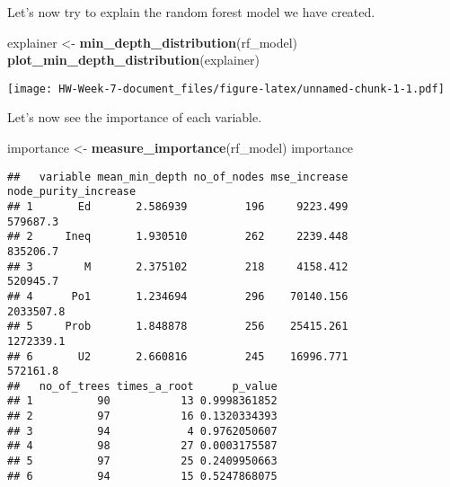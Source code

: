 \documentclass[
]{article}
\newenvironment{Shaded}{\begin{snugshade}}{\end{snugshade}}
\newcommand{\CommentTok}[1]{\textcolor[rgb]{0.56,0.35,0.01}{\textit{#1}}}
\newcommand{\FunctionTok}[1]{\textcolor[rgb]{0.13,0.29,0.53}{\textbf{#1}}}
\newcommand{\NormalTok}[1]{#1}
\newcommand{\OtherTok}[1]{\textcolor[rgb]{0.56,0.35,0.01}{#1}}
\begin{document}
Let's now try to explain the random forest model we have created.

\begin{Shaded}
\begin{Highlighting}[]
\NormalTok{explainer }\OtherTok{\textless{}{-}} \FunctionTok{min\_depth\_distribution}\NormalTok{(rf\_model)}
\FunctionTok{plot\_min\_depth\_distribution}\NormalTok{(explainer)}
\end{Highlighting}
\end{Shaded}

\texttt{[image: HW-Week-7-document\_files/figure-latex/unnamed-chunk-1-1.pdf]}

\begin{Shaded}
\end{Shaded}

Let's now see the importance of each variable.

\begin{Shaded}
\begin{Highlighting}[]
\NormalTok{importance }\OtherTok{\textless{}{-}} \FunctionTok{measure\_importance}\NormalTok{(rf\_model)}
\NormalTok{importance}
\end{Highlighting}
\end{Shaded}

\begin{verbatim}
##   variable mean_min_depth no_of_nodes mse_increase node_purity_increase
## 1       Ed       2.586939         196     9223.499             579687.3
## 2     Ineq       1.930510         262     2239.448             835206.7
## 3        M       2.375102         218     4158.412             520945.7
## 4      Po1       1.234694         296    70140.156            2033507.8
## 5     Prob       1.848878         256    25415.261            1272339.1
## 6       U2       2.660816         245    16996.771             572161.8
##   no_of_trees times_a_root      p_value
## 1          90           13 0.9998361852
## 2          97           16 0.1320334393
## 3          94            4 0.9762050607
## 4          98           27 0.0003175587
## 5          97           25 0.2409950663
## 6          94           15 0.5247868075
\end{verbatim}
\end{document}
